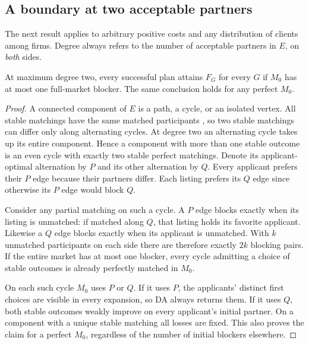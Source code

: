 \subsection{A boundary at two acceptable partners}
The next result applies to arbitrary positive costs and any distribution of clients among firms. Degree always refers to the number of acceptable partners in $E$, on \emph{both} sides.

\begin{theorem}\label{thm:two}
At maximum degree two, every successful plan attains $F_G$ for every $G$ if $M_0$ has at most one full-market blocker. The same conclusion holds for any perfect $M_0$.
\end{theorem}
\begin{proof}
A connected component of $E$ is a path, a cycle, or an isolated vertex. All stable matchings have the same matched participants \cite{roth1986}, so two stable matchings can differ only along alternating cycles. At degree two an alternating cycle takes up its entire component. Hence a component with more than one stable outcome is an even cycle with exactly two stable perfect matchings. Denote its applicant-optimal alternation by $P$ and its other alternation by $Q$. Every applicant prefers their $P$ edge because their partners differ. Each listing prefers its $Q$ edge since otherwise its $P$ edge would block $Q$.

Consider any partial matching on such a cycle. A $P$ edge blocks exactly when its listing is unmatched: if matched along $Q$, that listing holds its favorite applicant. Likewise a $Q$ edge blocks exactly when its applicant is unmatched. With $k$ unmatched participants on each side there are therefore exactly $2k$ blocking pairs. If the entire market has at most one blocker, every cycle admitting a choice of stable outcomes is already perfectly matched in $M_0$.

On each such cycle $M_0$ uses $P$ or $Q$. If it uses $P$, the applicants' distinct first choices are visible in every expansion, so DA always returns them. If it uses $Q$, both stable outcomes weakly improve on every applicant's initial partner. On a component with a unique stable matching all losses are fixed. This also proves the claim for a perfect $M_0$, regardless of the number of initial blockers elsewhere.
\end{proof}


